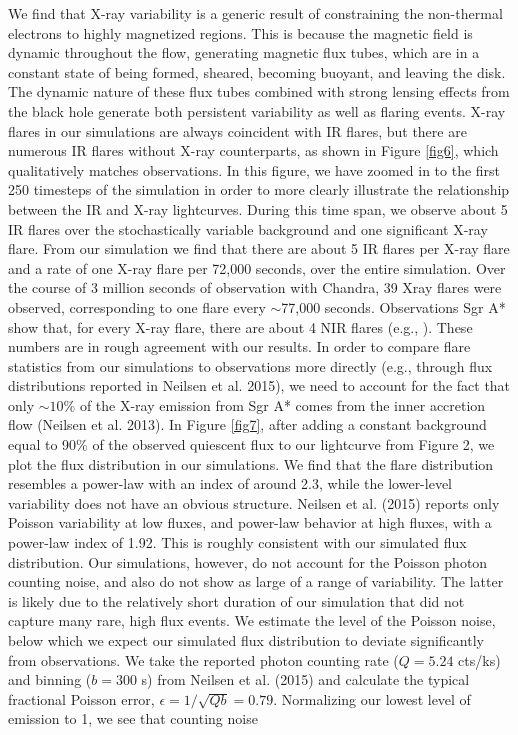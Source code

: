 We find that X-ray variability is a generic result of constraining the non-thermal electrons to highly magnetized regions. This is because the magnetic field is
dynamic throughout the flow, generating magnetic flux tubes, which are in a constant state of being formed, sheared, becoming buoyant, and leaving the disk. The
dynamic nature of these flux tubes combined with strong lensing effects from the black hole generate both persistent variability as well as flaring events.
X-ray flares in our simulations are always coincident with IR flares, but there are numerous IR flares without
X-ray counterparts, as shown in Figure \ref{fig6}, which qualitatively matches observations. In this figure, we have zoomed in to the first 250 timesteps of the simulation in order to more clearly illustrate the relationship between the IR and X-ray lightcurves. During this time span,
we observe about 5 IR flares over the stochastically variable background and one significant X-ray flare. From our simulation we find that there are about 5 IR flares per X-ray flare and a rate of one X-ray flare per 72,000 seconds, over the entire simulation. Over the course of
3 million seconds of observation with Chandra, 39 Xray flares were observed, corresponding to one flare every $\sim$77,000 seconds. Observations Sgr A* show that,
for every X-ray flare, there are about 4 NIR flares (e.g., \citealt{genzel2003, eckart2006}). These numbers
are in rough agreement with our results. In order to compare flare statistics from our simulations to observations more directly (e.g., through flux
distributions reported in Neilsen et al. 2015), we need to account for the fact that only  $\sim 10\%$ of the X-ray
emission from Sgr A* comes from the inner accretion flow (Neilsen et al. 2013). In Figure \ref{fig7}, after adding a
constant background equal to 90\% of the observed quiescent flux to our lightcurve from Figure 2, we plot the
flux distribution in our simulations. We find that the flare distribution resembles a power-law with an index of
around 2.3, while the lower-level variability does not have an obvious structure. Neilsen et al. (2015) reports only
Poisson variability at low fluxes, and power-law behavior at high fluxes, with a power-law index of 1.92. This is
roughly consistent with our simulated flux distribution. Our simulations, however, do not account for the Poisson photon counting noise, and also do not show as large of a range of variability. The latter is likely due to the
relatively short duration of our simulation that did not capture many rare, high flux events.
We estimate the level of the Poisson noise, below which we expect our simulated flux distribution to deviate significantly from observations. We take the reported photon counting rate ($Q = 5.24$ cts/ks) and binning ($b = 300$ s) from Neilsen et al. (2015) and calculate the typical fractional Poisson error, $\epsilon=1/\sqrt{Qb}=0.79$. Normalizing our lowest level of emission to 1, we see that counting noise

